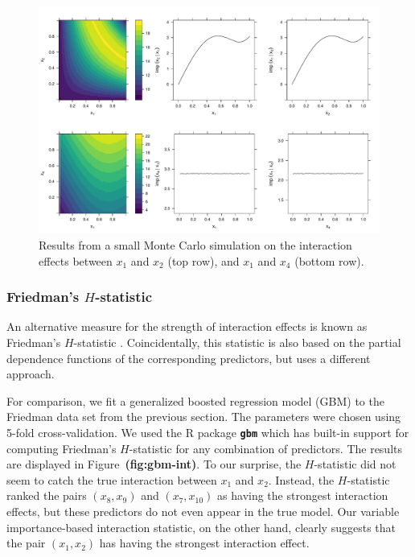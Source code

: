 \documentclass[12pt]{article}
\newcommand{\pkg}[1]{\texorpdfstring%
{{\normalfont\fontseries{b}\selectfont #1}}%
{#1}}
\def\pkg#1{\textbf{\texttt{#1}}}
\def\ref#1{\textbf{(#1)}}
\begin{document}
\begin{figure}[!htb]
  \centering
  \includegraphics[width=1\textwidth]{interaction-simulation}
  \caption{Results from a small Monte Carlo simulation on the interaction effects between $x_1$ and $x_2$ (top row), and $x_1$ and $x_4$ (bottom row). \label{fig:interaction-simulation}}
\end{figure}


\subsubsection{Friedman's $H$-statistic}

An alternative measure for the strength of interaction effects is known as Friedman's $H$-statistic \citep{friedman-2008-predictive}. Coincidentally, this statistic is also based on the partial dependence functions of the corresponding predictors, but uses a different approach.

For comparison, we fit a generalized boosted regression model (GBM) to the Friedman data set from the previous section. The parameters were chosen using 5-fold cross-validation. We used the R package \pkg{gbm} \citep{gbm-pkg} which has built-in support for computing Friedman's $H$-statistic for any combination of predictors. The results are displayed in Figure~\ref{fig:gbm-int}. To our surprise, the $H$-statistic did not seem to catch the true interaction between $x_1$ and $x_2$. Instead, the $H$-statistic ranked the pairs $\left(x_8, x_9\right)$ and $\left(x_7, x_{10}\right)$ as having the strongest interaction effects, but these predictors do not even appear in the true model. Our variable importance-based interaction statistic, on the other hand, clearly suggests that the pair $\left(x_1, x_2\right)$ has having the strongest interaction effect.
\end{document}
